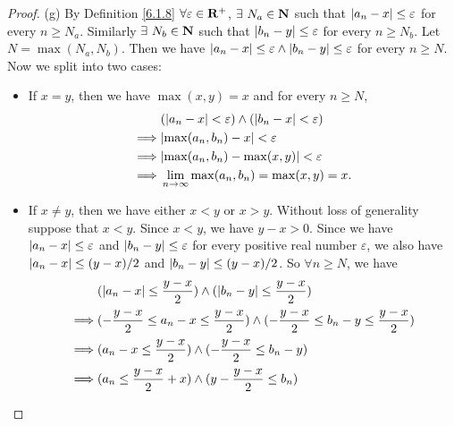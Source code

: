\begin{proof}{(g)}
    By Definition \ref{6.1.8} \(\forall \varepsilon \in \mathbf{R}^+\), \(\exists\ N_a \in \mathbf{N}\) such that \(\left\lvert a_n - x\right\rvert \leq \varepsilon\) for every \(n \geq N_a\).
    Similarly \(\exists\ N_b \in \mathbf{N}\) such that \(\left\lvert b_n - y\right\rvert \leq \varepsilon\) for every \(n \geq N_b\).
    Let \(N = \max(N_a, N_b)\).
    Then we have \(\left\lvert a_n - x\right\rvert \leq \varepsilon \land \left\lvert b_n - y\right\rvert \leq \varepsilon\) for every \(n \geq N\).
    Now we split into two cases:
    \begin{itemize}
        \item If \(x = y\), then we have \(\max(x, y) = x\) and for every \(n \geq N\),
              \begin{align*}
                           & (\abs{a_n - x} < \varepsilon) \land (\abs{b_n - x} < \varepsilon) \\
                  \implies & \abs{\max(a_n, b_n) - x} < \varepsilon                            \\
                  \implies & \abs{\max(a_n, b_n) - \max(x, y)} < \varepsilon                   \\
                  \implies & \lim_{n \to \infty} \max(a_n, b_n) = \max(x, y) = x.
              \end{align*}
        \item If \(x \neq y\), then we have either \(x < y\) or \(x > y\).
              Without loss of generality suppose that \(x < y\).
              Since \(x < y\), we have \(y - x > 0\).
              Since we have \(\left\lvert a_n - x\right\rvert \leq \varepsilon\) and \(\left\lvert b_n - y\right\rvert \leq \varepsilon\) for every positive real number \(\varepsilon\), we also have \(\left\lvert a_n - x\right\rvert \leq (y - x) / 2\) and \(\left\lvert b_n - y\right\rvert \leq (y - x) / 2\).
              So \(\forall n \geq N\), we have
              \begin{align*}
                           & (\abs{a_n - x} \leq \frac{y - x}{2}) \land (\abs{b_n - y} \leq \frac{y - x}{2})                                 \\
                  \implies & (-\frac{y - x}{2} \leq a_n - x \leq \frac{y - x}{2}) \land (-\frac{y - x}{2} \leq b_n - y \leq \frac{y - x}{2}) \\
                  \implies & (a_n - x \leq \frac{y - x}{2}) \land (-\frac{y - x}{2} \leq b_n - y)                                            \\
                  \implies & (a_n \leq \frac{y - x}{2} + x) \land (y - \frac{y - x}{2} \leq b_n)                                             \\

\end{align*}
\end{itemize}
\end{proof}

